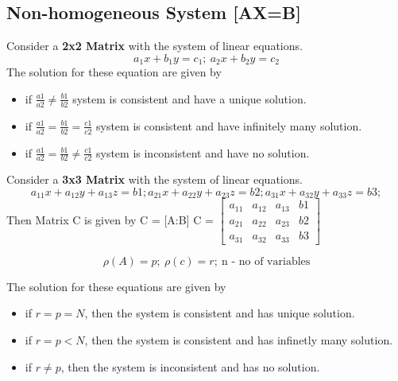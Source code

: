 \subsection*{Non-homogeneous System [AX=B]}
Consider a \textbf{2x2 Matrix} with the system of linear equations.
\[a_1x+b_1y=c_1;\ a_2x+b_2y=c_2\]
The solution for these equation are given by
\begin{itemize}
    \item if \(\frac{a1}{a2}\neq \frac{b1}{b2}\) system is consistent and have a unique solution.
    \item if \(\frac{a1}{a2}=\frac{b1}{b2}=\frac{c1}{c2}\) system is consistent and have infinitely many solution.
    \item if \(\frac{a1}{a2}=\frac{b1}{b2}\neq\frac{c1}{c2}\) system is inconsistent and have no solution.
\end{itemize}
\vspace{0.2cm}Consider a \textbf{3x3 Matrix} with the system of linear equations.
\[a_{11}x + a_{12}y + a_{13}z = b1; a_{21}x + a_{22}y + a_{23}z = b2; a_{31}x + a_{32}y + a_{33}z = b3;\]
Then Matrix C is given by 
    C = [A:B]    C =
    $\begin{bmatrix}
    a_{11} & a_{12} & a_{13} & b1\\
    a_{21} & a_{22} & a_{23} & b2\\
    a_{31} & a_{32} & a_{33} & b3
    \end{bmatrix}$
    \begin{fleqn}
    \[\rho(A)=p;\ \rho(c)=r;\ \text{n - no of variables}\]
    \end{fleqn}
The solution for these equations are given by
\begin{itemize}
    \item if \(r=p=N\), then the system is consistent and has unique solution.
    \item if \(r=p<N\), then the system is consistent and has infinetly many solution.
    \item if \(r\neq p\), then the system is inconsistent and has no solution.
\end{itemize}


